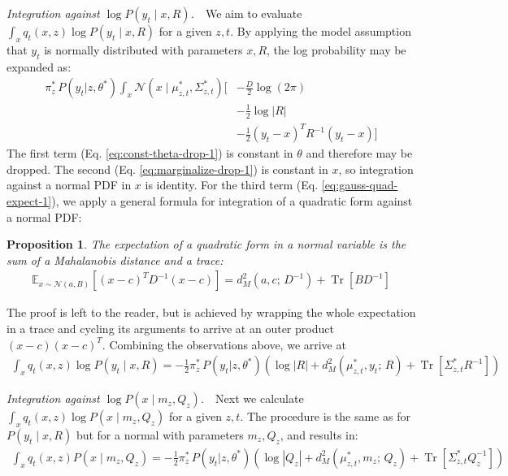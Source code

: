 \documentclass{article}         %
\newtheorem{proposition}{Proposition}[section]
\newcommand{\inv}{^{-1}}
\newcommand{\EE}{\mathbb{E}}
\newcommand{\NN}{\mathcal{N}}
\newcommand{\abs}[1]{\left| #1 \right|}
\newcommand{\pn}[1]{\left( #1 \right)}
\newcommand{\bc}[1]{\left[ #1 \right]}
\DeclareMathOperator{\Tr}{Tr}
\begin{document}
\textit{Integration against $\log P(y_t \mid x, R)$.}\ \ We aim to evaluate $\int_x q_t(x, z) \log P(y_t \mid x, R)$ for a given $z,t$. By applying the model assumption that $y_t$ is normally distributed with parameters $x, R$, the log probability may be expanded as:
\begin{align}
    \pi_{z}^*\, P(y_t | z, \theta^*) \int_x \NN(x \mid \mu^*_{z, t}, \Sigma^*_{z, t}) \bigg[
        &-\frac{D}{2}\log(2\pi) \label{eq:const-theta-drop-1}\\
        &- \frac{1}{2}\log \abs{R} \label{eq:marginalize-drop-1} \\
        &- \frac{1}{2}(y_t - x)^T R\inv (y_t - x) \bigg] \label{eq:gauss-quad-expect-1}
\end{align}
The first term (Eq. \ref{eq:const-theta-drop-1}) is constant in $\theta$ and therefore may be dropped. The second (Eq. \ref{eq:marginalize-drop-1}) is constant in $x$, so integration against a normal PDF in $x$ is identity. For the third term (Eq. \ref{eq:gauss-quad-expect-1}), we apply a general formula for integration of a quadratic form against a normal PDF:

\begin{proposition}
The expectation of a quadratic form in a normal variable is the sum of a Mahalanobis distance and a trace:
\begin{align}
    \EE_{x\sim\NN(a, B)} \bc{(x - c)^T D\inv (x - c)} = d^2_M(a, c;\, D\inv) + \Tr\bc{BD\inv}
\end{align}
\label{prop:norm-quad-expect}
\end{proposition}

The proof is left to the reader, but is achieved by wrapping the whole expectation in a trace and cycling its arguments to arrive at an outer product $(x - c)(x - c)^T$. Combining the observations above, we arrive at 
\begin{align}
    \int_x q_t(x, z) \log P(y_t \mid x, R) = -\frac{1}{2}\pi_{z}^*\, P(y_t | z, \theta^*) \pn{ \log \abs{R} + d^2_M(\mu_{z,t}^*, y_t;\, R) + \Tr\bc{\Sigma_{z,t}^* R\inv} }
    \label{eq:obj-term-1}
\end{align}

\textit{Integration against $\log P(x \mid m_{z}, Q_{z})$.}\ \ Next we calculate $\int_x q_t(x, z) \log P(x \mid m_{z}, Q_{z})$ for a given $z,t$. The procedure is the same as for $P(y_t \mid x, R)$ but for a normal with parameters $m_{z}, Q_{z}$, and results in:
\begin{align}
    \int_x q_t(x, z) P(x \mid m_{z}, Q_{z}) = -\frac{1}{2}\pi_{z}^*\, P(y_t | z, \theta^*) \pn{ \log \abs{Q_z} + d^2_M(\mu_{z,t}^*, m_z;\, Q_z) + \Tr\bc{\Sigma_{z,t}^* Q_z\inv} }
    \label{eq:obj-term-2}
\end{align}
\end{document}
